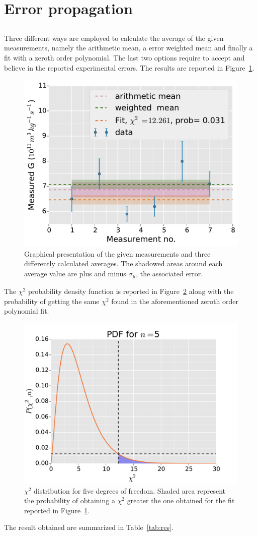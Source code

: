 \documentclass[twocolumn]{article}
\begin{document}
\section{Error propagation} %
\label{sec:error_propagation}
\subsection{} %
	Three different ways are employed to calculate the average of the given measurements, namely the arithmetic mean, a error weighted mean and finally a fit with a zeroth order polynomial.
	The last two options require to accept and believe in the reported experimental errors.
	The results are reported in Figure~\ref{fig:g}.

	\begin{figure}[h!]
		\begin{center}
			\includegraphics[width=.4\textwidth]{fig/g.pdf}
		\end{center}
		\caption{Graphical presentation of the given measurements and three differently calculated averages. The shadowed areas around each average value are plus and minus $\sigma_{\mu}$, the associated error.}
		\label{fig:g}
	\end{figure}

	The $\chi ^2 $ probability density function is reported in Figure~\ref{fig:xpdf} along with the probability of getting the same $\chi ^2 $ found in the aforementioned zeroth order polynomial fit.

	\begin{figure}[h!]
		\begin{center}
			\includegraphics[width=.4 \textwidth]{fig/xpdf.pdf}
		\end{center}
		\caption{$\chi^2$ distribution for five degrees of freedom. Shaded area represent the probability of obtaining a $\chi^2$ greater the one obtained for the fit reported in Figure~\ref{fig:g}.}
		\label{fig:xpdf}
	\end{figure}
	The result obtained are summarized in Table~\ref{tab:res}.
\end{document}

